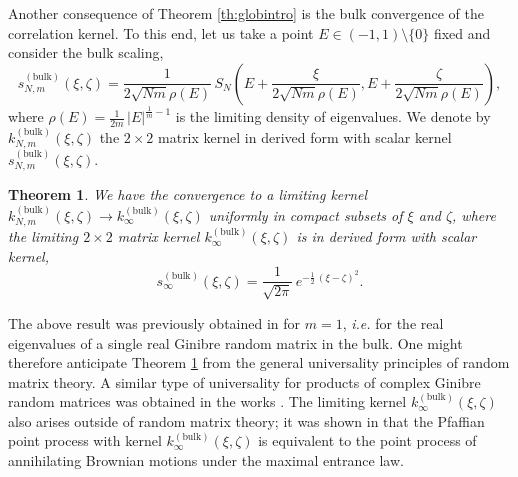 \documentclass[11pt,reqno]{amsproc}
\newtheorem{theorem}{Theorem}
\numberwithin{equation}{section}
\numberwithin{theorem}{section}
\begin{document}
Another consequence of Theorem \ref{th:globintro} is the bulk convergence of the correlation kernel. To this end, let us take a point $E \in (-1,1)\setminus\{0\}$ fixed and consider the bulk scaling,
\begin{equation}
s_{N,m}^{(\mathrm{bulk})}(\xi,\zeta) = \frac{1}{2\sqrt{Nm}\rho(E)}\,S_{N}\left(E+\frac{\xi}{2\sqrt{Nm}\rho(E)},E+\frac{\zeta}{2\sqrt{Nm}\rho(E)}\right), \label{scaledKintro}
\end{equation}
where $\rho(E) = \frac{1}{2m}\,|E|^{\frac{1}{m}-1}$ is the limiting density of eigenvalues. We denote by $k^{(\mathrm{bulk})}_{N,m}(\xi,\zeta)$ the $2 \times 2$ matrix kernel in derived form with scalar kernel $s_{N,m}^{(\mathrm{bulk})}(\xi,\zeta)$.

\begin{theorem}
\label{th:bulkconvintro}
We have the convergence to a limiting kernel $k^{(\mathrm{bulk})}_{N,m}(\xi,\zeta) \to k_{\infty}^{(\mathrm{bulk})}(\xi,\zeta)$ uniformly in compact subsets of $\xi$ and $\zeta$, where the limiting $2 \times 2$ matrix kernel $k_{\infty}^{(\mathrm{bulk})}(\xi,\zeta)$ is in derived form with scalar kernel,
\begin{equation}
s^{(\mathrm{bulk})}_{\infty}(\xi,\zeta) = \frac{1}{\sqrt{2\pi}}\,e^{-\frac{1}{2}\,(\xi-\zeta)^{2}}.
\end{equation} 
\end{theorem}
The above result was previously obtained in \cite{BS09} for $m=1$, \textit{i.e.} for the real eigenvalues of a single real Ginibre random matrix in the bulk. One might therefore anticipate Theorem \ref{th:bulkconvintro} from the general universality principles of random matrix theory. A similar type of universality for products of complex Ginibre random matrices was obtained in the works \cite{DDZ16,DY16}. The limiting kernel $k_{\infty}^{(\mathrm{bulk})}(\xi,\zeta)$ also arises outside of random matrix theory; it was shown in \cite{TZ11} that the Pfaffian point process with kernel $k_{\infty}^{(\mathrm{bulk})}(\xi,\zeta)$ is equivalent to the point process of annihilating Brownian motions under the maximal entrance law. 
\end{document}
